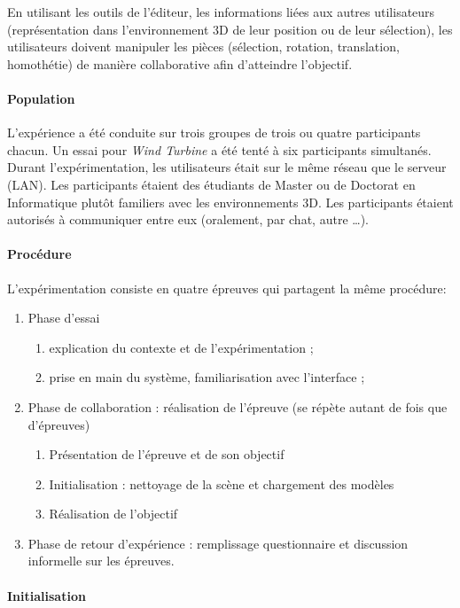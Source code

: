 En utilisant les outils de l'éditeur, les informations liées aux autres utilisateurs 
(représentation dans l'environnement 3D de leur position ou de leur sélection), les 
utilisateurs doivent manipuler les pièces (sélection, rotation, translation, 
homothétie) de manière collaborative afin d'atteindre l'objectif. 
\paragraph{Population}
L'expérience a été conduite sur trois groupes de trois ou quatre participants 
chacun. Un essai pour \textit{Wind Turbine} a été tenté à six participants 
simultanés.
Durant l'expérimentation, les utilisateurs était sur le même réseau que le serveur 
(\gls{LAN}). 
Les participants étaient des étudiants de Master ou de Doctorat en Informatique 
plutôt familiers avec les environnements 3D. Les participants étaient autorisés à 
communiquer entre eux (oralement, par chat, autre \dots).
\paragraph{Procédure}
L'expérimentation consiste en quatre épreuves qui partagent la même procédure:
\begin{enumerate}
	\item Phase d'essai 
	\begin{enumerate}
		\item explication du contexte et de l'expérimentation ;
		\item prise en main du système, familiarisation avec 
		l'interface ;
	\end{enumerate}
	\item Phase de collaboration : réalisation de l'épreuve (se répète autant de fois 
	que d'épreuves)
	\begin{enumerate}
		\item Présentation de l'épreuve et de son objectif
		\item Initialisation : nettoyage de la scène et chargement des modèles
		\item Réalisation de l'objectif
	\end{enumerate}
	\item Phase de retour d'expérience : remplissage questionnaire et discussion 
	informelle sur les épreuves.
\end{enumerate}

\paragraph{Initialisation}


